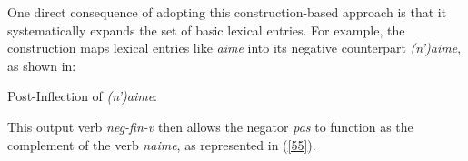 \documentclass[output=paper]{langsci/langscibook}
\begin{document}
{\begin{exe}
\begin{xlist}
\begin{exe}
\begin{xlist}
One direct consequence of adopting this construction-based approach
is that it systematically expands the set of basic lexical entries.
For example, the construction maps lexical entries like
\emph{aime} into its negative counterpart \emph{(n')aime}, as shown
in:

\ea
Post-Inflection of \emph{(n')aime}: \\
\z


\noindent
This output verb {\it neg-fin-v} then allows the negator \emph{pas} to function
as the complement of the verb \emph{naime}, as represented in (\ref{55}).

\ea\label{55}
\small{}
\z





\end{xlist}
\end{exe}
\end{xlist}
\end{exe}}
\end{document}
